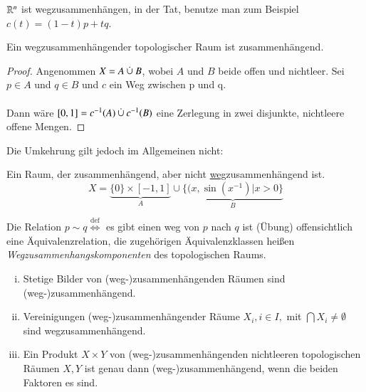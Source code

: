 \documentclass[a4paper,10pt]{scrartcl}
\begin{document}
\begin{ex*}
$ \mathbb{R}^n $ ist wegzusammenhängen, in der Tat, benutze man zum Beispiel $ c(t)=(1-t)p+tq $. \fixme[fig20]
\end{ex*}
\begin{st}
Ein wegzusammenhängender topologischer Raum ist zusammenhängend.
\end{st}
\begin{proof}
Angenommen $ X=A\mathbin{\dot{\cup}} B $, wobei $ A $ und $ B $ beide offen und nichtleer.  Sei $ p\in A $ und $ q\in B $ und $ c $ ein Weg zwischen p und q. \\ \fixme[fig21]\\
Dann wäre $[0,1]=c^{-1}(A)\mathbin{\dot{\cup}} c^{-1}(B)$ eine Zerlegung in zwei disjunkte, nichtleere offene Mengen.
\end{proof}
Die Umkehrung gilt jedoch im Allgemeinen nicht:
\begin{ex*}
Ein Raum, der zusammenhängend, aber nicht \underline{weg}zusammenhängend ist.
\[
X=\underbrace{\{0\}\times [-1,1]}_{A}\cup\underbrace{\{(x, \sin(x^{-1})|x>0\}}_{B}
\] 
\fixme[fig22]
\end{ex*}
Die Relation $ p\sim q \stackrel{\text{def}}{\iff} $ es gibt einen weg von $ p $ nach $ q $ ist (Übung) offensichtlich eine Äquivalenzrelation, die zugehörigen Äquivalenzklassen heißen \emph{Wegzusammenhangskomponenten} des topologischen Raums.
\begin{st}
\begin{enumerate}[(i)]
\item Stetige Bilder von (weg-)zusammenhängenden Räumen sind (weg-)zusammenhängend.
\item Vereinigungen (weg-)zusammenhängender Räume $ X_i, i\in I, $ mit $ \bigcap X_i\neq \emptyset $ sind wegzusammenhängend.
\item Ein Produkt $ X\times Y $ von (weg-)zusammenhängenden nichtleeren topologischen Räumen $ X,Y $ ist genau dann (weg-)zusammenhängend, wenn die beiden Faktoren es sind. 
\end{enumerate}
\end{st}
\end{document}
